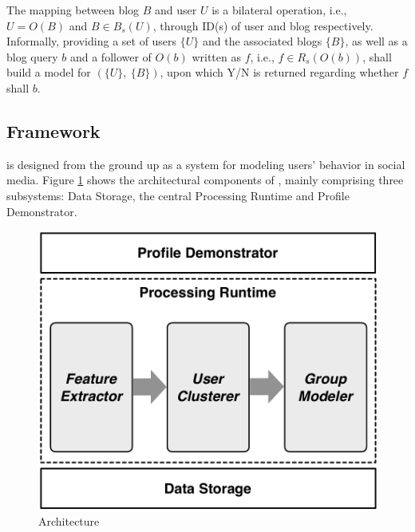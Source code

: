The mapping between blog $B$ and user $U$ is a bilateral operation, i.e., $U = O(B)$ and $B \in B_s(U)$, through ID(s) of user and blog respectively.
%
Informally, providing a set of users $\{U\}$ and the associated blogs $\{B\}$, as well as a blog query $b$ and a follower of $O(b)$ written as $f$, i.e., $f \in R_s(O(b))$, \sys{} shall build a \retg{} model for $(\{U\},\ \{B\})$, upon which Y/N is returned regarding whether $f$ shall \ret{} $b$.


\subsection{\sys{} Framework}
\sys{} is designed from the ground up as a system for modeling users' \retg{} behavior in social media.
Figure \ref{fig:framework} shows the architectural components of \sys{}, mainly comprising three subsystems: Data Storage, the central Processing Runtime and Profile Demonstrator.

\begin{figure}[!htb]
\centering
\includegraphics[width=.75\linewidth]{figures/architecture}
\caption{\sys{} Architecture}
\label{fig:framework}
\end{figure}

